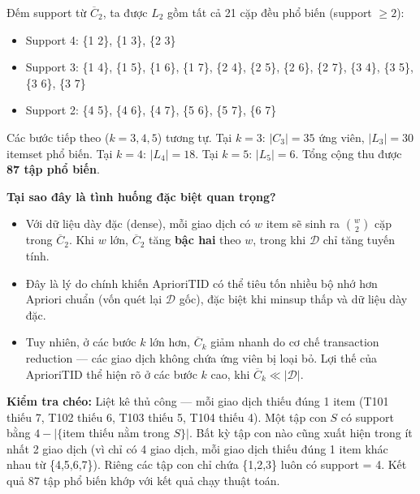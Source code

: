 \documentclass[12pt]{article}
\begin{document}
Đếm support từ $\overline{C}_2$, ta được $L_2$ gồm tất cả 21 cặp đều phổ biến (support $\geq 2$):

\begin{itemize}
    \item Support 4: \{1 2\}, \{1 3\}, \{2 3\}
    \item Support 3: \{1 4\}, \{1 5\}, \{1 6\}, \{1 7\}, \{2 4\}, \{2 5\}, \{2 6\}, \{2 7\}, \{3 4\}, \{3 5\}, \{3 6\}, \{3 7\}
    \item Support 2: \{4 5\}, \{4 6\}, \{4 7\}, \{5 6\}, \{5 7\}, \{6 7\}
\end{itemize}

Các bước tiếp theo ($k=3, 4, 5$) tương tự. Tại $k=3$: $|C_3| = 35$ ứng viên, $|L_3| = 30$ itemset phổ biến. Tại $k=4$: $|L_4| = 18$. Tại $k=5$: $|L_5| = 6$. Tổng cộng thu được \textbf{87 tập phổ biến}.

\textbf{Tại sao đây là tình huống đặc biệt quan trọng?}

\begin{itemize}
    \item Với dữ liệu dày đặc (dense), mỗi giao dịch có $w$ item sẽ sinh ra $\binom{w}{2}$ cặp trong $\overline{C}_2$. Khi $w$ lớn, $\overline{C}_2$ tăng \textbf{bậc hai} theo $w$, trong khi $\mathcal{D}$ chỉ tăng tuyến tính.
    \item Đây là lý do chính khiến AprioriTID có thể tiêu tốn nhiều bộ nhớ hơn Apriori chuẩn (vốn quét lại $\mathcal{D}$ gốc), đặc biệt khi minsup thấp và dữ liệu dày đặc.
    \item Tuy nhiên, ở các bước $k$ lớn hơn, $\overline{C}_k$ giảm nhanh do cơ chế transaction reduction --- các giao dịch không chứa ứng viên bị loại bỏ. Lợi thế của AprioriTID thể hiện rõ ở các bước $k$ cao, khi $\overline{C}_k \ll |\mathcal{D}|$.
\end{itemize}

\textbf{Kiểm tra chéo:} Liệt kê thủ công --- mỗi giao dịch thiếu đúng 1 item (T101 thiếu 7, T102 thiếu 6, T103 thiếu 5, T104 thiếu 4). Một tập con $S$ có support bằng $4 - |\{$item thiếu nằm trong $S\}|$. Bất kỳ tập con nào cũng xuất hiện trong ít nhất 2 giao dịch (vì chỉ có 4 giao dịch, mỗi giao dịch thiếu đúng 1 item khác nhau từ \{4,5,6,7\}). Riêng các tập con chỉ chứa \{1,2,3\} luôn có support = 4. Kết quả 87 tập phổ biến khớp với kết quả chạy thuật toán.
\end{document}
